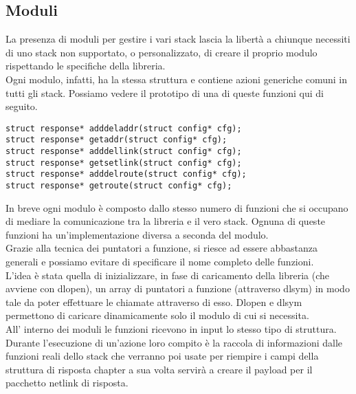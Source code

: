 \subsection{Moduli}
La presenza di moduli per gestire i vari stack lascia la libert\`a a chiunque necessiti di uno stack non supportato, o personalizzato, di creare il proprio modulo rispettando le specifiche della libreria.\\
Ogni modulo, infatti, ha la stessa struttura e contiene azioni generiche comuni in tutti gli stack. Possiamo vedere il prototipo di una di queste funzioni qui di seguito.
\begin{lstlisting}[style=CStyle]
struct response* adddeladdr(struct config* cfg);
struct response* getaddr(struct config* cfg);
struct response* adddellink(struct config* cfg);
struct response* getsetlink(struct config* cfg);
struct response* adddelroute(struct config* cfg);
struct response* getroute(struct config* cfg);
\end{lstlisting}
In breve ogni modulo \`e composto dallo stesso numero di funzioni che si occupano di mediare la comunicazione tra la libreria e il vero stack.
Ognuna di queste funzioni ha un'implementazione diversa a seconda del modulo.\\
Grazie alla tecnica dei puntatori a funzione, si riesce ad essere abbastanza generali e possiamo evitare di specificare il nome completo delle funzioni. \\
L'idea \`e stata quella di inizializzare, in fase di caricamento della libreria (che avviene con dlopen), un array di puntatori a funzione (attraverso dlsym) in modo tale da poter effettuare le chiamate attraverso di esso. Dlopen e dlsym permettono di caricare dinamicamente solo il modulo di cui si necessita.\\
All' interno dei moduli le funzioni ricevono in input lo stesso tipo di struttura. Durante l'esecuzione di un'azione loro compito \`e la raccola di informazioni dalle funzioni reali dello stack che verranno poi usate per riempire i campi della struttura di risposta chapter a sua volta servir\`a a creare il payload per il pacchetto netlink di risposta.
\clearpage{\pagestyle{empty}\cleardoublepage}
